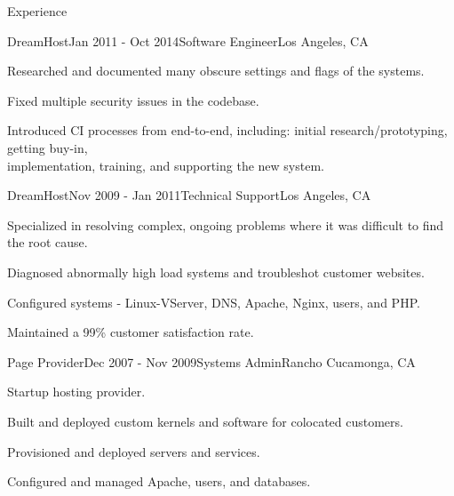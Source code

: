 \documentclass{resume} %
\begin{document}
\begin{rSection}{Experience}
\begin{rSubsection}{DreamHost}{Jan 2011 - Oct 2014}{Software Engineer}{Los Angeles, CA}
\item Researched and documented many obscure settings and flags of the systems.
\item Fixed multiple security issues in the codebase.
\item Introduced CI processes from end-to-end, including: initial research/prototyping, getting buy-in, \\ implementation, training, and supporting the new system.
\end{rSubsection}


\begin{rSubsection}{DreamHost}{Nov 2009 - Jan 2011}{Technical Support}{Los Angeles, CA}
\item Specialized in resolving complex, ongoing problems where it was difficult to find the root cause.
\item Diagnosed abnormally high load systems and troubleshot customer websites.
\item Configured systems - Linux-VServer, DNS, Apache, Nginx, users, and PHP.
\item Maintained a 99\% customer satisfaction rate.
\end{rSubsection}


\begin{rSubsection}{Page Provider}{Dec 2007 - Nov 2009}{Systems Admin}{Rancho Cucamonga, CA}
\item Startup hosting provider.
\item Built and deployed custom kernels and software for colocated customers.
\item Provisioned and deployed servers and services.
\item Configured and managed Apache, users, and databases.
\end{rSubsection}

\end{rSection}

\end{document}
